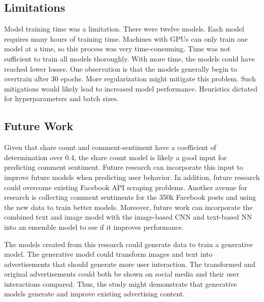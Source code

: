 \documentclass{article}
\begin{document}
\subsection{Limitations}
Model training time was a limitation. There were twelve models. Each model requires many hours of training time. Machines with GPUs can only train one model at a time, so this process was very time-consuming. Time was not sufficient to train all models thoroughly. With more time, the models could have reached lower losses.  One observation is that the models generally begin to overtrain after 30 epochs. More regularization might mitigate this problem. Such mitigations would likely lead to increased model performance. Heuristics dictated for hyperparameters and batch sizes. 

\subsection{Future Work}
Given that share count and comment-sentiment have a coefficient of determination over 0.4, the share count model is likely a good input for predicting comment sentiment. Future research can incorporate this input to improve future models when predicting user behavior. In addition, future research could overcome existing Facebook API scraping problems. Another avenue for research is collecting comment sentiments for the 350k Facebook posts and using the new data to train better models.  Moreover, future work can incorporate the combined text and image model with the image-based CNN and text-based NN into an ensemble model to see if it improves performance.

The models created from this research could generate data to train a generative model.  The generative model could transform images and text into advertisements that should generate more user interaction.  The transformed and original advertisements could both be shown on social media and their user interactions compared. Thus, the study might demonstrate that generative models generate and improve existing advertising content.


   
 
\end{document}
